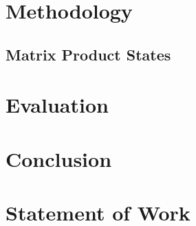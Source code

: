 \documentclass{ipgpmaster}
\begin{document}
\checkyears

\vspace*{5mm}




\def\author{Ryan, Arvind, Payal, and Will}
\def\title{CS 259: Final Project \\ Tensor Networks for Machine Learning}
\def\shorttitle{Two Qubits}
\def\unit{UCLA - MQST}
\def\team{Ryan, Arvind, Payal, and Will}
\def\spe{MQST}
\def\supervisor{Tony Nowatzki}
\def\mydate{\today}

\Entete

\begin{abstract}
For our project we chose to explore the methods of the Google X paper 'Tensor Networks for Machine Learning' by Jack Hidary et al \cite{roberts2019tensornetwork}. Here, the authors explore the use of tensor networks to improve the training performance of classifier neural networks. This is done by using tensor networks to compress the weights of the neural network, which reduces the number of parameters that need to be trained. Representing the weights in
\end{abstract}

\newpage
\tableofcontents
\newpage

\section{Methodology}
\subsection{Matrix Product States}

\section{Evaluation}
\section{Conclusion}
\section{Statement of Work}

\nocite{*}
\end{document}
